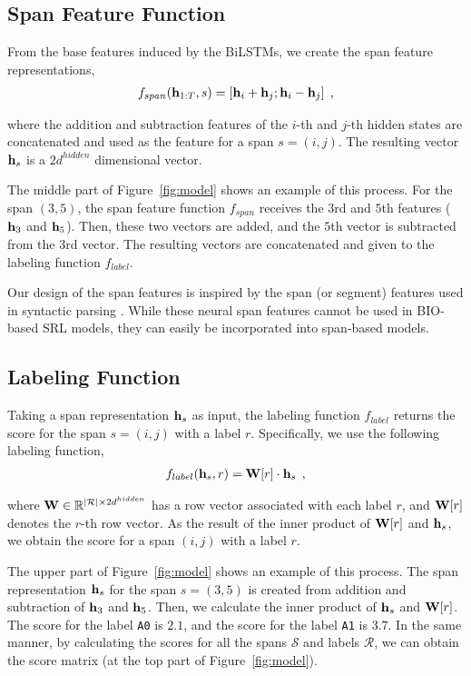 \documentclass[11pt,a4paper]{article}
\begin{document}
\subsection*{Span Feature Function}
From the base features induced by the BiLSTMs, we create the span feature representations,
\begin{align}
\label{eq:span}
f_{span}({\bf h}_{1:T}, s) = [ {\bf h}_i + {\bf h}_j; {\bf h}_i - {\bf h}_j] \:\:,
\end{align}

\noindent
where the addition and subtraction features of the $i$-th and $j$-th hidden states are concatenated and used as the feature for a span $s = (i, j)$.
The resulting vector ${\bf h}_s$ is a $2d^{hidden}$ dimensional vector.

The middle part of Figure~\ref{fig:model} shows an example of this process.
For the span $(3, 5)$, the span feature function $f_{span}$ receives the $3$rd and $5$th features (${\bf h}_3$ and ${\bf h}_5$).
Then, these two vectors are added, and the $5$th vector is subtracted from the $3$rd vector.
The resulting vectors are concatenated and given to the labeling function $f_{label}$.

Our design of the span features is inspired by the span (or segment) features used in syntactic parsing \cite{wang:16,stern:17,teranishi:17}.
While these neural span features cannot be used in BIO-based SRL models, they can easily be incorporated into span-based models.

\subsection*{Labeling Function}
Taking a span representation ${\bf h}_s$ as input, the labeling function $f_{label}$ returns the score for the span $s = (i, j)$ with a label $r$.
Specifically, we use the following labeling function,
\begin{align}
\label{eq:label}
f_{label}({\bf h}_s, r) = {\bf W}[r] \cdot {\bf h}_s \:\:,
\end{align}

\noindent       
where ${\bf W} \in \mathbb{R}^{|\mathcal{R}| \times 2d^{hidden}}$ has a row vector associated with each label $r$, and ${\bf W}[r]$ denotes the $r$-th row vector.
As the result of the inner product of ${\bf W}[r]$ and ${\bf h}_s$, we obtain the score for a span $(i, j)$ with a label $r$.

The upper part of Figure~\ref{fig:model} shows an example of this process.
The span representation ${\bf h}_s$ for the span $s = (3, 5)$ is created from addition and subtraction of ${\bf h}_3$ and ${\bf h}_5$.
Then, we calculate the inner product of ${\bf h}_s$ and ${\bf W}[r]$.
The score for the label {\tt A0} is $2.1$, and the score for the label {\tt A1} is $3.7$.
In the same manner, by calculating the scores for all the spans $\mathcal{S}$ and labels $\mathcal{R}$, we can obtain the score matrix (at the top part of Figure~\ref{fig:model}).
\end{document}
